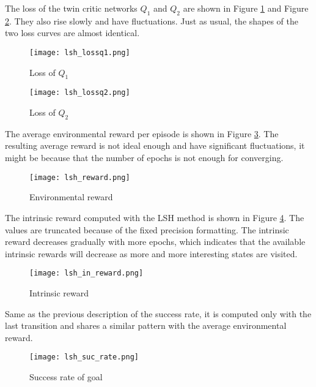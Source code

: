 \documentclass[a4paper, 12pt]{report}
\begin{document}
    The loss of the twin critic networks $Q_1$ and $Q_2$ are shown in Figure \ref{lsh_lossq1} and Figure \ref{lsh_lossq2}. They also rise slowly and have fluctuations. Just as usual, the shapes of the two loss curves are almost identical.

        \begin{figure}[H]
        \centering
        \texttt{[image: lsh\_lossq1.png]}
        \caption{Loss of $Q_1$}
            \label{lsh_lossq1}
        \end{figure}

        \begin{figure}[H]
        \centering
        \texttt{[image: lsh\_lossq2.png]}
        \caption{Loss of $Q_2$}
            \label{lsh_lossq2}
        \end{figure}

    The average environmental reward per episode is shown in Figure \ref{lsh_reward}. The resulting average reward is not ideal enough and have significant fluctuations, it might be because that the number of epochs is not enough for converging.

        \begin{figure}[H]
        \centering
        \texttt{[image: lsh\_reward.png]}
        \caption{Environmental reward}
            \label{lsh_reward}
        \end{figure}

    The intrinsic reward computed with the LSH method is shown in Figure \ref{lsh_in_reward}. The values are truncated because of the fixed precision formatting. The intrinsic reward decreases gradually with more epochs, which indicates that the available intrinsic rewards will decrease as more and more interesting states are visited.

        \begin{figure}[H]
        \centering
        \texttt{[image: lsh\_in\_reward.png]}
        \caption{Intrinsic reward}
            \label{lsh_in_reward}
        \end{figure}

    Same as the previous description of the success rate, it is computed only with the last transition and shares a similar pattern with the average environmental reward.

        \begin{figure}[H]
        \centering
        \texttt{[image: lsh\_suc\_rate.png]}
        \caption{Success rate of goal}
        \end{figure}
\end{document}
